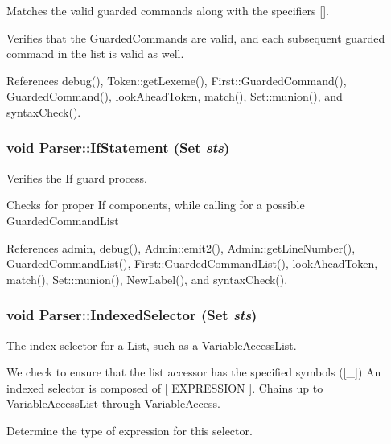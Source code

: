 Matches the valid guarded commands along with the specifiers \mbox{[}\mbox{]}. 

Verifies that the GuardedCommands are valid, and each subsequent guarded command in the list is valid as well. 

References debug(), Token::getLexeme(), First::GuardedCommand(), GuardedCommand(), lookAheadToken, match(), Set::munion(), and syntaxCheck().

\hypertarget{classParser_af7ef9a71f5e821040a16974c4602e23e}{
\subsubsection[{IfStatement}]{\setlength{\rightskip}{0pt plus 5cm}void Parser::IfStatement ({\bf Set} {\em sts})}}
\label{classParser_af7ef9a71f5e821040a16974c4602e23e}


Verifies the If guard process. 

Checks for proper If components, while calling for a possible GuardedCommandList 

References admin, debug(), Admin::emit2(), Admin::getLineNumber(), GuardedCommandList(), First::GuardedCommandList(), lookAheadToken, match(), Set::munion(), NewLabel(), and syntaxCheck().

\hypertarget{classParser_ae6fd008bc26a87fbfe39d41a7391c01a}{
\subsubsection[{IndexedSelector}]{\setlength{\rightskip}{0pt plus 5cm}void Parser::IndexedSelector ({\bf Set} {\em sts})}}
\label{classParser_ae6fd008bc26a87fbfe39d41a7391c01a}


The index selector for a List, such as a VariableAccessList. 

We check to ensure that the list accessor has the specified symbols (\mbox{[}\_\-\mbox{]}) An indexed selector is composed of \mbox{[} EXPRESSION \mbox{]}. Chains up to VariableAccessList through VariableAccess. 

Determine the type of expression for this selector.

